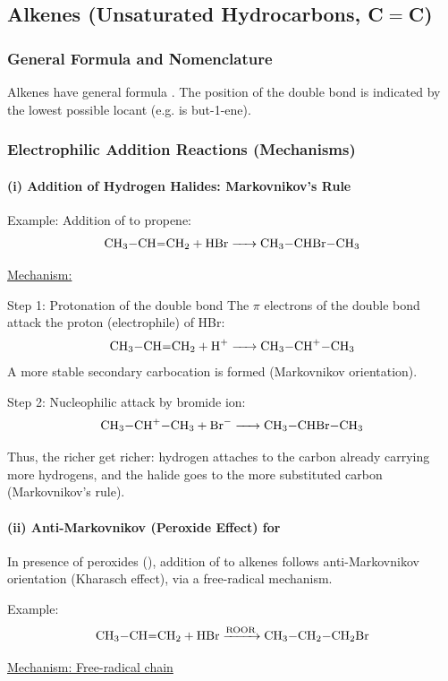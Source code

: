\documentclass[12pt,a4paper]{article}
\begin{document}
\subsection{Alkenes (Unsaturated Hydrocarbons, C$=$C)}

\subsubsection{General Formula and Nomenclature}
Alkenes have general formula .  
The position of the double bond is indicated by the lowest possible locant (e.g.  is but-1-ene).

\subsubsection{Electrophilic Addition Reactions (Mechanisms)}

\paragraph{(i) Addition of Hydrogen Halides: Markovnikov's Rule}

Example: Addition of  to propene:
\[
\ce{CH3-CH=CH2 + HBr -> CH3-CHBr-CH3}
\]

\underline{Mechanism:}

Step 1: Protonation of the double bond  
The $\pi$ electrons of the double bond attack the proton (electrophile) of HBr:
\[
\ce{CH3-CH=CH2 + H^+ -> CH3-CH^+-CH3}
\]
A more stable secondary carbocation is formed (Markovnikov orientation).

Step 2: Nucleophilic attack by bromide ion:
\[
\ce{CH3-CH^+-CH3 + Br^- -> CH3-CHBr-CH3}
\]

Thus, the richer get richer: hydrogen attaches to the carbon already carrying more hydrogens, and the halide goes to the more substituted carbon (Markovnikov's rule).

\paragraph{(ii) Anti-Markovnikov (Peroxide Effect) for }

In presence of peroxides (), addition of  to alkenes follows anti-Markovnikov orientation (Kharasch effect), via a free-radical mechanism.

Example:
\[
\ce{CH3-CH=CH2 + HBr ->[ROOR] CH3-CH2-CH2Br}
\]

\underline{Mechanism: Free-radical chain}
\end{document}
